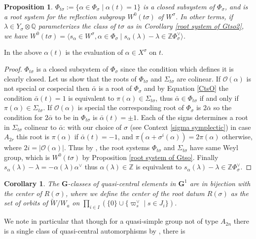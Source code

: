 \documentclass{amsart}
\newtheorem{proposition}[equation]{Proposition}
\newtheorem{corollary}[equation]{Corollary}
\numberwithin{equation}{section}
\theoremstyle{definition}
\theoremstyle{remark}
\newcommand\bG{{\mathbf G}}
\newcommand\BQ{{\mathbb Q}}
\newcommand\BZ{{\mathbb Z}}
\newcommand\CO{{\mathcal O}}
\newcommand\Gun{{\bG^1}}
\newcommand\tW{{\widetilde W}}
\newcommand\Wa{W_a}
\newcommand\genby[1]{\mathopen\langle#1\mathclose\rangle}
\begin{document}
\begin{proposition}\label{Phi_tsigma}
$\Phi_{t\sigma}:=\{\alpha\in\Phi_\sigma\mid \alpha(t)=1\}$ is a closed subsystem
of $\Phi_\sigma$, and is a root system for the
reflection subgroup $W^0(t\sigma)$ of $W^\sigma$. In other terms, if
$\lambda\in Y_\sigma\otimes\BQ$ parameterizes the class of $t\sigma$ as in 
Corollary \ref{root system of Gtso2},
we have $W^0(t\sigma)=\genby{s_\alpha\in W^\sigma, \alpha\in\Phi_\sigma\mid
s_\alpha(\lambda)-\lambda\in\BZ\Phi_\sigma^\vee}$.
\end{proposition}
In the above $\alpha(t)$ is the evaluation of $\alpha\in X^\sigma$
on $t$.
\begin{proof}
$\Phi_{t\sigma}$ is a closed subsystem of
$\Phi_\sigma$ since the condition which defines it is clearly closed. 
Let us show that the roots of $\Phi_{t\sigma}$ and $\Sigma_{t\sigma}$ are
colinear. If $\CO(\alpha)$ is not special or cospecial then $\bar\alpha$ is a
root of $\Phi_\sigma$ and by Equation \ref{CtsO} the condition $\bar\alpha(t)=1$
is equivalent to $\pi(\alpha)\in\Sigma_{t\sigma}$, thus
$\bar\alpha\in\Phi_{t\sigma}$ if and only if $\pi(\alpha)\in\Sigma_{t\sigma}$.
If $\CO(\alpha)$ is special
the corresponding root of $\Phi_\sigma$ is $2\bar\alpha$ so the condition
for $2\bar\alpha$ to be in $\Phi_{t\sigma}$ is $\bar\alpha(t)=\pm 1$.
Each of the signs determines a root in $\Sigma_{t\sigma}$
colinear to $\bar\alpha$:  with our choice of 
$\sigma$ (see Context \ref{sigma symplectic}) in case $A_{2r}$ this root is 
$\pi(\alpha)$ if 
$\bar\alpha(t)=-1$, and $\pi(\alpha+\sigma^i(\alpha))=2\pi(\alpha)$ otherwise, 
where $2i=|\CO(\alpha)|$.
Thus by \cite[remark after 8.5]{grnccomp}, the root systems $\Phi_{t\sigma}$
and $\Sigma_{t\sigma}$
have same Weyl group, which is $W^0(t\sigma)$ by Proposition
\ref{root system of Gtso}.
Finally $s_\alpha(\lambda)-\lambda=-\alpha(\lambda)\alpha^\vee$ thus
$\alpha(\lambda)\in\BZ$ is equivalent to 
$s_\alpha(\lambda)-\lambda\in\BZ\Phi_\sigma^\vee$.
\end{proof}
\begin{corollary}\label{centerR(sigma)}
The $\bG$-classes of quasi-central elements in $\Gun$ are in bijection with 
the center of $R(\sigma)$, where
we define the center of the root datum $R(\sigma)$ as the
set of orbits of $\tW/\Wa$ on 
$\prod_{i\in I}(\{0\}\cup\{\varpi_s^\vee\mid s\in J_i\})$.
\end{corollary}
We note in particular that though for a quasi-simple group not of type
$A_{2n}$ there is a single
class of quasi-central automorphisms by \cite[1.22]{grnc}, there is
\end{document}
